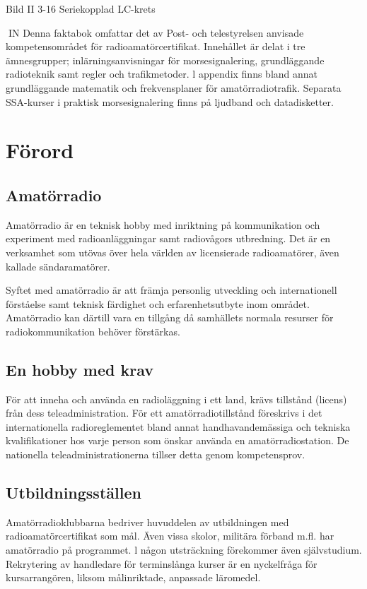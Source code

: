 \documentclass[a4paper,twoside,twocolumn,openright]{book}
\begin{document}
Bild II 3-16 Seriekopplad LC-krets

IN
Denna faktabok omfattar det av Post- och telestyrelsen anvisade kompetensområdet för
radioamatörcertifikat.
Innehållet är delat i tre ämnesgrupper; inlärningsanvisningar för morsesignalering,
grundläggande radioteknik samt regler och trafikmetoder. l appendix finns bland annat
grundläggande matematik och frekvensplaner för amatörradiotrafik.
Separata SSA-kurser i praktisk morsesignalering finns på ljudband och datadisketter.

\chapter*{Förord}

\section*{Amatörradio}

Amatörradio är en teknisk hobby med inriktning på kommunikation och experiment med
radioanläggningar samt radiovågors utbredning. Det är en verksamhet som utövas över
hela världen av licensierade radioamatörer, även kallade sändaramatörer.

Syftet med amatörradio är att främja personlig utveckling och internationell förståelse
samt teknisk färdighet och erfarenhetsutbyte inom området. Amatörradio kan därtill vara
en tillgång då samhällets normala resurser för radiokommunikation behöver förstärkas.

\section*{En hobby med krav}

För att inneha och använda en radioläggning i ett land, krävs tillstånd (licens) från
dess teleadministration. För ett amatörradiotillstånd föreskrivs i det internationella
radioreglementet bland annat handhavandemässiga och tekniska kvalifikationer hos
varje person som önskar använda en amatörradiostation. De nationella teleadministrationerna tillser detta genom kompetensprov.

\section*{Utbildningsställen}

Amatörradioklubbarna bedriver huvuddelen
av utbildningen med radioamatörcertifikat
som mål. Även vissa skolor, militära förband
m.fl. har amatörradio på programmet. l någon utsträckning förekommer även självstudium. Rekrytering av handledare för terminslånga kurser är en nyckelfråga för kursarrangören, liksom målinriktade, anpassade läromedel.
\end{document}
